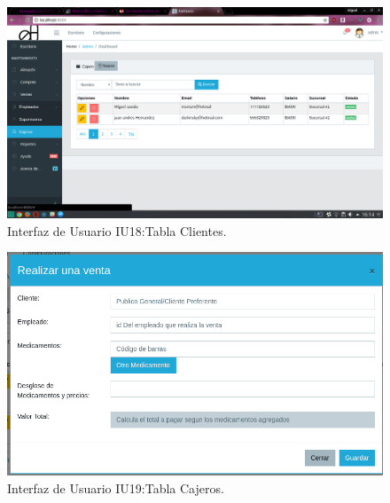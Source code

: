 \begin{figure}[htbp!]
	\begin{center}
\includegraphics[width=\textwidth]{Pantallas/tablaCajeros}
		\caption{Interfaz de Usuario IU18:Tabla Clientes.}
	\end{center}
\end{figure}



\begin{figure}[htbp!]
	\begin{center}
\includegraphics[width=\textwidth]{Pantallas/pantallaVentas}
		\caption{Interfaz de Usuario IU19:Tabla Cajeros.}
	\end{center}
\end{figure}

